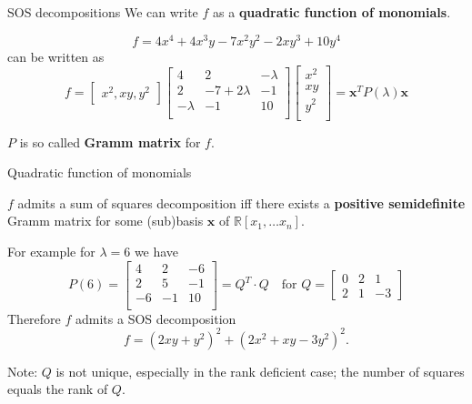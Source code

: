 \documentclass[9pt]{beamer}
\theoremstyle{definition}
\newcommand{\R}{\mathbb{R}}
\begin{document}
\begin{frame}{SOS decompositions}
  \pause
  We can write $f$ as a \textbf{quadratic function of monomials}.
  \begin{example}
  \[
  f = 4x^4 + 4x^3y - 7x^2y^2 - 2xy^3 + 10y^4
  \]
  can be written as
  \[ f =
  \begin{bmatrix}
     x^2, xy, y^2
  \end{bmatrix}
  \begin{bmatrix}
     4         & 2               & -\lambda\\
     2         & -7 + 2\lambda   & -1\\
     -\lambda  & -1              & 10\\
  \end{bmatrix}
  \begin{bmatrix}
   x^2 \\
   xy \\
   y^2 \\
  \end{bmatrix}
  = \mathbf{x}^T P(\lambda) \mathbf{x}
  \]
  \end{example}
  \pause
  $P$ is so called \textbf{Gramm matrix} for $f$.

\end{frame}

\begin{frame}{Quadratic function of monomials}

  \begin{lemma}
  $f$ admits a sum of squares decomposition iff there exists a \textbf{positive semidefinite} Gramm matrix for some (sub)basis $\mathbf{x}$ of $\R[x_1, \ldots x_n]$.
  \end{lemma}
\pause
\begin{example}
For example for $\lambda = 6$ we have
\[
 P(6) = \begin{bmatrix}
   4  &  2 & -6\\
   2  &  5 & -1\\
   -6 & -1 & 10\\
 \end{bmatrix} = Q^T \cdot Q \quad \text{for }
 Q = \begin{bmatrix}
   0 & 2 &  1\\
   2 & 1 & -3
 \end{bmatrix}
\]
Therefore $f$ admits a SOS decomposition
\[f = \left( 2xy + y^2 \right)^2 + \left(2x^2 + xy - 3y^2 \right)^2.\]
\end{example}

\pause
Note: $Q$ is not unique, especially in the rank deficient case; the number of squares equals the rank of $Q$.

\end{frame}
\end{document}
